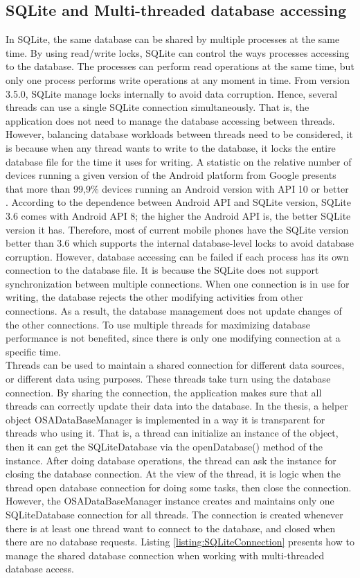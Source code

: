 \subsection{SQLite and Multi-threaded database accessing}
In SQLite, the same database can be shared by multiple processes at the same time. By using read/write locks, SQLite can control the ways processes accessing to the database. The processes can perform read operations at the same time, but only one process performs write operations at any moment in time. From version 3.5.0, SQLite manage locks internally to avoid data corruption. Hence, several threads can use a single SQLite connection simultaneously. That is, the application does not need to manage the database accessing between threads. However, balancing database workloads between threads need to be considered, it is because when any thread wants to write to the database, it locks the entire database file for the time it uses for writing.
A statistic on the relative number of devices running a given version of the Android platform from Google presents that more than 99,9\% devices running an Android version with API 10 or better \cite{DEVELOPERANDROIDAPI}. According to the dependence between Android API and SQLite version\cite{DEVELOPERANDROIDSQL}, SQLite 3.6 comes with Android API 8; the higher the Android API is, the better SQLite version it has. Therefore, most of current mobile phones have the SQLite version better than 3.6 which supports the internal database-level locks to avoid database corruption. However, database accessing can be failed if each process has its own connection to the database file. It is because the SQLite does not support synchronization between multiple connections. When one connection is in use for writing, the database rejects the other modifying activities from other connections. As a result, the database management does not update changes of the other connections. To use multiple threads for maximizing database performance is not benefited, since there is only one modifying connection at a specific time.\\
Threads can be used to maintain a shared connection for different data sources, or different data using purposes. These threads take turn using the database connection. By sharing the connection, the application makes sure that all threads can correctly update their data into the database. In the thesis, a helper object OSADataBaseManager is implemented in a way it is transparent for threads who using it. That is, a thread can initialize an instance of the object, then it can get the SQLiteDatabase via the openDatabase() method of the instance. After doing database operations, the thread can ask the instance for closing the database connection. At the view of the thread, it is logic when the thread open database connection for doing some tasks, then close the connection. However, the OSADataBaseManager instance creates and maintains only one SQLiteDatabase connection for all threads. The connection is created whenever there is at least one thread want to connect to the database, and closed when there are no database requests. Listing \ref{listing:SQLiteConnection} presents how to manage the shared database connection when working with multi-threaded database access.

